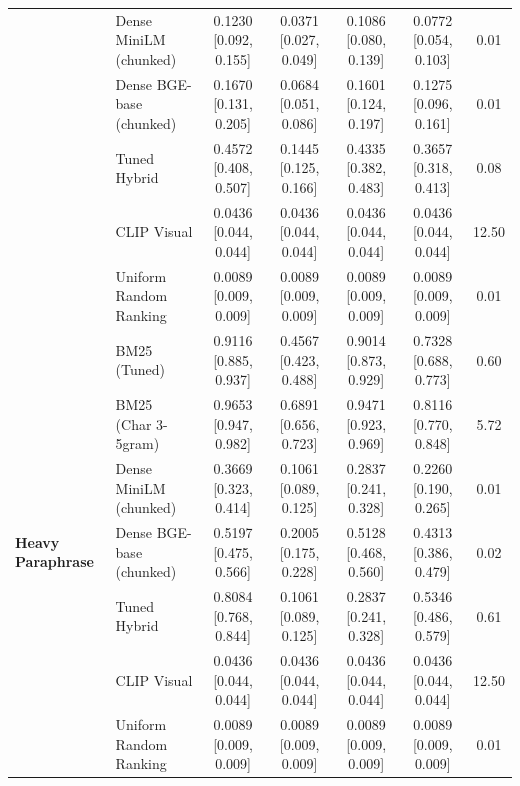 \begin{table}[t]
\begin{tabular}{llccccc}
 & Dense MiniLM (chunked)  & 0.1230 [0.092, 0.155] & 0.0371 [0.027, 0.049] & 0.1086 [0.080, 0.139] & 0.0772 [0.054, 0.103] & 0.01 \\
 & Dense BGE-base (chunked)& 0.1670 [0.131, 0.205] & 0.0684 [0.051, 0.086] & 0.1601 [0.124, 0.197] & 0.1275 [0.096, 0.161] & 0.01 \\
 & Tuned Hybrid            & 0.4572 [0.408, 0.507] & 0.1445 [0.125, 0.166] & 0.4335 [0.382, 0.483] & 0.3657 [0.318, 0.413] & 0.08 \\
 & CLIP Visual             & 0.0436 [0.044, 0.044] & 0.0436 [0.044, 0.044] & 0.0436 [0.044, 0.044] & 0.0436 [0.044, 0.044] & 12.50 \\
 & Uniform Random Ranking  & 0.0089 [0.009, 0.009] & 0.0089 [0.009, 0.009] & 0.0089 [0.009, 0.009] & 0.0089 [0.009, 0.009] & 0.01 \\
\midrule
\multirow{7}{*}{\textbf{Heavy Paraphrase}}
 & BM25 (Tuned)            & 0.9116 [0.885, 0.937] & 0.4567 [0.423, 0.488] & 0.9014 [0.873, 0.929] & 0.7328 [0.688, 0.773] & 0.60 \\
 & BM25 (Char 3-5gram)     & 0.9653 [0.947, 0.982] & 0.6891 [0.656, 0.723] & 0.9471 [0.923, 0.969] & 0.8116 [0.770, 0.848] & 5.72 \\
 & Dense MiniLM (chunked)  & 0.3669 [0.323, 0.414] & 0.1061 [0.089, 0.125] & 0.2837 [0.241, 0.328] & 0.2260 [0.190, 0.265] & 0.01 \\
 & Dense BGE-base (chunked)& 0.5197 [0.475, 0.566] & 0.2005 [0.175, 0.228] & 0.5128 [0.468, 0.560] & 0.4313 [0.386, 0.479] & 0.02 \\
 & Tuned Hybrid            & 0.8084 [0.768, 0.844] & 0.1061 [0.089, 0.125] & 0.2837 [0.241, 0.328] & 0.5346 [0.486, 0.579] & 0.61 \\
 & CLIP Visual             & 0.0436 [0.044, 0.044] & 0.0436 [0.044, 0.044] & 0.0436 [0.044, 0.044] & 0.0436 [0.044, 0.044] & 12.50 \\
 & Uniform Random Ranking  & 0.0089 [0.009, 0.009] & 0.0089 [0.009, 0.009] & 0.0089 [0.009, 0.009] & 0.0089 [0.009, 0.009] & 0.01 \\
\bottomrule
\end{tabular}
\end{table}

